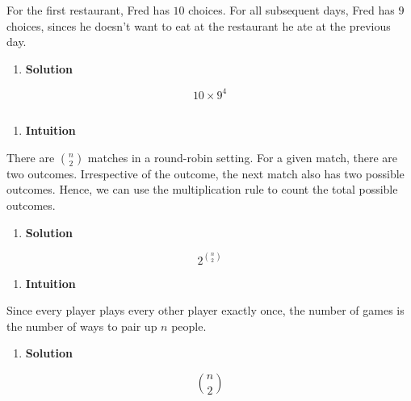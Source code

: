\documentclass[]{book}
\providecommand{\tightlist}{%
  \setlength{\itemsep}{0pt}\setlength{\parskip}{0pt}}
\begin{document}
For the first restaurant, Fred has \(10\) choices. For all subsequent
days, Fred has \(9\) choices, sinces he doesn't want to eat at the
restaurant he ate at the previous day.

\begin{enumerate}
\def\labelenumi{(\alph{enumi})}
\setcounter{enumi}{1}
\tightlist
\item
  \textbf{Solution}
\end{enumerate}

\[ 10 \times 9^{4} \]

\subsection{}\label{section-3}

\begin{enumerate}
\def\labelenumi{(\alph{enumi})}
\tightlist
\item
  \textbf{Intuition}
\end{enumerate}

There are \({n \choose 2}\) matches in a round-robin setting. For a
given match, there are two outcomes. Irrespective of the outcome, the
next match also has two possible outcomes. Hence, we can use the
multiplication rule to count the total possible outcomes.

\begin{enumerate}
\def\labelenumi{(\alph{enumi})}
\tightlist
\item
  \textbf{Solution}
\end{enumerate}

\[ 2^{{n \choose 2}} \]

\begin{enumerate}
\def\labelenumi{(\alph{enumi})}
\setcounter{enumi}{1}
\tightlist
\item
  \textbf{Intuition}
\end{enumerate}

Since every player plays every other player exactly once, the number of
games is the number of ways to pair up \(n\) people.

\begin{enumerate}
\def\labelenumi{(\alph{enumi})}
\setcounter{enumi}{1}
\tightlist
\item
  \textbf{Solution}
\end{enumerate}

\[ {n \choose 2} \]

\subsection{}\label{section-4}
\end{document}
